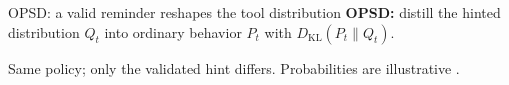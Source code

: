 \begin{frame}[t]{OPSD: a valid reminder reshapes the tool distribution}
  \vspace{1mm}
  \centering
  {\small\textcolor{DeckGold}{\textbf{OPSD:}} distill the hinted distribution $Q_t$ into ordinary behavior $P_t$ with $D_{\mathrm{KL}}(P_t\|Q_t)$.}

  \vspace{0mm}
  {\scriptsize\color{DeckMuted}Same policy; only the validated hint differs. Probabilities are illustrative \citep{cursor2026composer25}.}
\end{frame}
